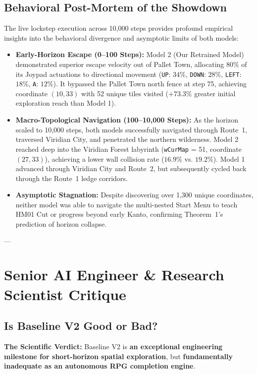 \documentclass[conference]{IEEEtran}
\begin{document}
\subsection{Behavioral Post-Mortem of the Showdown}
The live lockstep execution across 10,000 steps provides profound empirical insights into the behavioral divergence and asymptotic limits of both models:
\begin{itemize}
    \item \textbf{Early-Horizon Escape (0--100 Steps):} Model 2 (Our Retrained Model) demonstrated superior escape velocity out of Pallet Town, allocating $80\%$ of its Joypad actuations to directional movement (\texttt{UP}: $34\%$, \texttt{DOWN}: $28\%$, \texttt{LEFT}: $18\%$, \texttt{A}: $12\%$). It bypassed the Pallet Town north fence at step 75, achieving coordinate $(10, 33)$ with 52 unique tiles visited ($+73.3\%$ greater initial exploration reach than Model 1).
    \item \textbf{Macro-Topological Navigation (100--10,000 Steps):} As the horizon scaled to 10,000 steps, both models successfully navigated through Route~1, traversed Viridian City, and penetrated the northern wilderness. Model 2 reached deep into the Viridian Forest labyrinth (\texttt{wCurMap} = 51, coordinate $(27, 33)$), achieving a lower wall collision rate ($16.9\%$ vs. $19.2\%$). Model 1 advanced through Viridian City and Route~2, but subsequently cycled back through the Route~1 ledge corridors.
    \item \textbf{Asymptotic Stagnation:} Despite discovering over 1,300 unique coordinates, neither model was able to navigate the multi-nested Start Menu to teach HM01 Cut or progress beyond early Kanto, confirming Theorem~1's prediction of horizon collapse.
\end{itemize}

---

\section{Senior AI Engineer \& Research Scientist Critique}

\subsection{Is Baseline V2 Good or Bad?}
\textbf{The Scientific Verdict:} Baseline V2 is \textbf{an exceptional engineering milestone for short-horizon spatial exploration}, but \textbf{fundamentally inadequate as an autonomous RPG completion engine}.
\end{document}

